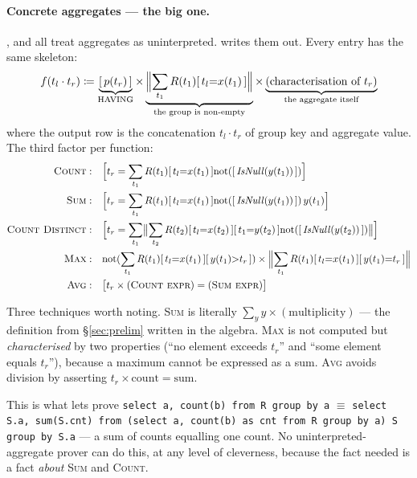 \paragraph{Concrete aggregates --- the big one.}
\udp{}, \wetune{} and \QED{} all treat aggregates as uninterpreted. \sqlsolver{} writes them
out. Every entry has the same skeleton:
\[
f(t_l\cdot t_r) \coloneqq \underbrace{[\,p(t_r)\,]}_{\text{HAVING}}\times
\underbrace{\Bigl\lVert\sum_{t_1}R(t_1)[\,t_l{=}x(t_1)\,]\Bigr\rVert}_{\text{the group is non-empty}}\times
\underbrace{(\text{characterisation of }t_r)}_{\text{the aggregate itself}}
\]
where the output row is the concatenation $t_l\cdot t_r$ of group key and aggregate value.
The third factor per function:
\begin{align*}
\textsc{Count}:&\quad \Bigl[t_r=\sum_{t_1}R(t_1)[\,t_l{=}x(t_1)\,]\mathrm{not}([\,\mathit{IsNull}(y(t_1))\,])\Bigr]\\
\textsc{Sum}:&\quad \Bigl[t_r=\sum_{t_1}R(t_1)[\,t_l{=}x(t_1)\,]\mathrm{not}([\,\mathit{IsNull}(y(t_1))\,])\,y(t_1)\Bigr]\\
\textsc{Count Distinct}:&\quad \Bigl[t_r=\sum_{t_1}\bigl\lVert\sum_{t_2}R(t_2)[\,t_l{=}x(t_2)\,][\,t_1{=}y(t_2)\,]\mathrm{not}([\,\mathit{IsNull}(y(t_2))\,])\bigr\rVert\Bigr]\\
\textsc{Max}:&\quad \mathrm{not}(\sum_{t_1}R(t_1)[\,t_l{=}x(t_1)\,][\,y(t_1){>}t_r\,])\times\Bigl\lVert\sum_{t_1}R(t_1)[\,t_l{=}x(t_1)\,][\,y(t_1){=}t_r\,]\Bigr\rVert\\
\textsc{Avg}:&\quad \bigl[t_r\times(\textsc{Count expr}) = (\textsc{Sum expr})\bigr]
\end{align*}

Three techniques worth noting. \textsc{Sum} is literally
$\sum_y y\times(\text{multiplicity})$ --- the definition from \S\ref{sec:prelim} written in
the algebra. \textsc{Max} is not computed but \emph{characterised} by two properties (``no
element exceeds $t_r$'' and ``some element equals $t_r$''), because a maximum cannot be
expressed as a sum. \textsc{Avg} avoids division by asserting
$t_r\times\mathrm{count}=\mathrm{sum}$.

\begin{remark}
This is what lets \sqlsolver{} prove
\lstinline|select a, count(b) from R group by a| $\equiv$
\lstinline|select S.a, sum(S.cnt) from (select a, count(b) as cnt from R group by a) S group by S.a|
--- a sum of counts equalling one count. No uninterpreted-aggregate prover can do this, at
any level of cleverness, because the fact needed is a fact \emph{about} \textsc{Sum} and
\textsc{Count}.
\end{remark}

